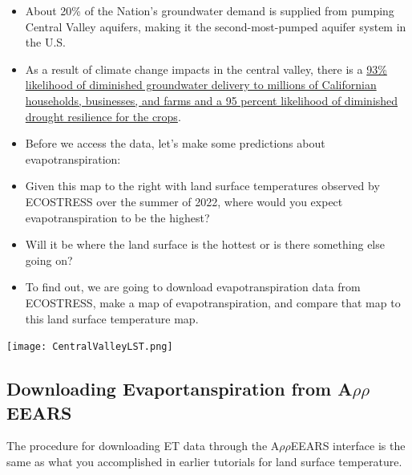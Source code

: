 \documentclass[oneside,a4paper,11pt,explicit]{book}
\begin{document}
\begin{tcolorbox}[colback=yellow!5!white,colframe=IceCreamLeaf,title=\textbf{California's Central Valley}]
\begin{multicols}{2}
\begin{itemize}
			\item About 20\% of the Nation's groundwater demand is supplied from pumping Central Valley aquifers, making it the second-most-pumped aquifer system in the U.S.
			\item As a result of climate change impacts in the central valley, there is a \href{https://www.energy.ca.gov/sites/default/files/2019-12/Water_CCCA4-EXT-2018-001_ada.pdf}{93\% likelihood of diminished groundwater delivery to millions of Californian households, businesses, and farms and a 95 percent likelihood of diminished drought resilience for the crops}. 
		\end{itemize}
	\end{multicols}
\end{tcolorbox}

\begin{tcolorbox}[colback=yellow!5!white,colframe=IceCreamLeaf,title=\textbf{Hypotheses}]
	\begin{multicols}{2}

		\vspace*{.25em}

		\begin{itemize}
			\item Before we access the data, let's make some predictions about evapotranspiration:
			\item Given this map to the right with land surface temperatures observed by ECOSTRESS over the summer of 2022, where would you expect evapotranspiration to be the highest?
			\item Will it be where the land surface is the hottest or is there something else going on?
			\item To find out, we are going to download evapotranspiration data from ECOSTRESS, make a map of evapotranspiration, and compare that map to this land surface temperature map.
		\end{itemize}

		\columnbreak	

		\centerline{\texttt{[image: CentralValleyLST.png]}}
		
	\end{multicols}
\end{tcolorbox}

\subsection{Downloading Evaportanspiration from A$\rho\rho$EEARS}

The procedure for downloading ET data through the A$\rho\rho$EEARS interface is the same as what you accomplished in earlier tutorials for land surface temperature.
\end{document}
